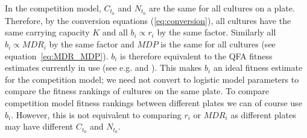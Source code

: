 In the competition model, \(C_{t_{0}}\) and \(N_{t_{0}}\) are the same
for all cultures on a plate. Therefore, by the conversion equations
(\ref{eq:conversion}), all cultures have the same carrying capacity
\(K\) and all \(b_{i} \propto r_{i}\) by the same factor. Similarly
all \(b_{i} \propto MDR_{i}\) by the same factor and \(MDP\) is the
same for all cultures (see equation~\ref{eq:MDR_MDP}). \(b_{i}\) is
therefore equivalent to the QFA fitness estimates currently in use
(see e.g. \citet{Addinall2011} and \citet{qfa2016}). This makes
\(b_{i}\) an ideal fitness estimate for the competition model; we need
not convert to logistic model parameters to compare the fitness
rankings of cultures on the same plate. To compare competition model
fitness rankings between different plates we can of course use
\(b_{i}\). However, this is not equivalent to comparing \(r_{i}\) or
\(MDR_{i}\) as different plates may have different \(C_{t_{0}}\) and
\(N_{t_{0}}\).

